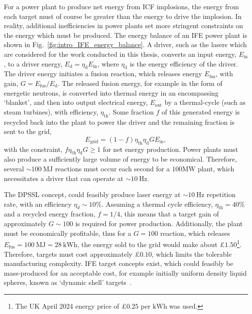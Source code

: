 For a power plant to produce net energy from \ac{ICF} implosions, the energy from each target must of course be greater than the energy to drive the implosion.
In reality, additional inefficiencies in power plants set more stringent constraints on the energy which must be produced.
The energy balance of an \ac{IFE} power plant is shown in Fig.~\ref{fig:intro_IFE_energy_balance}.
A driver, such as the lasers which are considered for the work conducted in this thesis, converts an input energy, $E_{\text{in}}$, to a driver energy, $E_{\text{d}} = \eta_{\text{d}}E_{\text{in}}$, where $\eta_{\text{d}}$ is the energy efficiency of the driver.
The driver energy initiates a fusion reaction, which releases energy $E_{\text{fus}}$, with gain, $G = E_{\text{fus}}/E_{\text{d}}$.
The released fusion energy, for example in the form of energetic neutrons, is converted into thermal energy in an encompassing `blanket', and then into output electrical energy, $E_\text{out}$ by a thermal-cycle (such as steam turbines), with efficiency, $\eta_{\text{th}}$.
Some fraction $f$ of this generated energy is recycled back into the plant to power the driver and the remaining fraction is sent to the grid,
\begin{equation}
    E_{\text{grid}} = (1-f) \eta_{\text{th}} \eta_{\text{d}} G E_{\text{in}},
\end{equation}
with the constraint, $f \eta_{\text{th}} \eta_{\text{d}} G \geq 1$ for net energy production.
Power plants must also produce a sufficiently large volume of energy to be economical.
Therefore, several $\sim100\ \text{MJ}$ reactions must occur each second for a $100 \text{MW}$ plant, which necessitates a driver that can operate at $\sim10\ \text{Hz}$.

The \ac{DPSSL} concept, could feasibly produce laser energy at $\sim10\ \text{Hz}$ repetition rate, with an efficiency $\eta_d\sim10\%$.
Assuming a thermal cycle efficiency, $\eta_{\text{th}}=40\%$ and a recycled energy fraction, $f=1/4$, this means that a target gain of approximately $G\sim100$ is required for power production.
Additionally, the plant must be economically profitable, thus for a $G=100$ reaction, which releases $E_{\text{fus}} = 100\ \text{MJ} = 28\ \text{kWh}$, the energy sold to the grid would make about $£1.50$\footnote{The UK April 2024 energy price of $£0.25$ per $\text{kWh}$ was used.}.
Therefore, targets must cost approximately $£0.10$, which limits the tolerable manufacturing complexity.
\ac{IFE} target concepts exist, which could feasibly be mass-produced for an acceptable cost, for example initially uniform density liquid spheres, known as `dynamic shell' targets~\cite{goncharov_novel_2020,igumenshchev_proof--principle_2023}.

